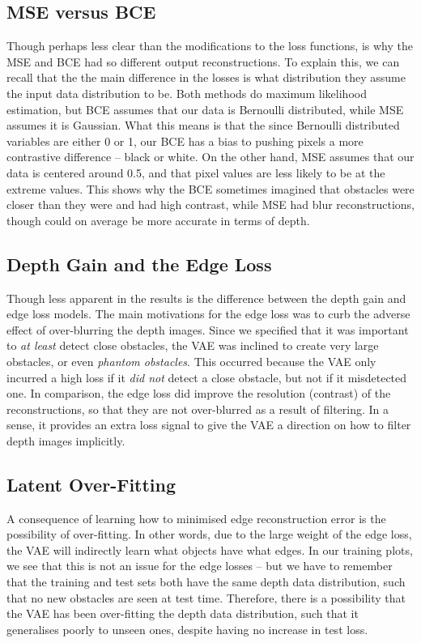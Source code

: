 \subsection{MSE versus BCE}
Though perhaps less clear than the modifications to the loss functions, is why the MSE and BCE had so different output reconstructions. To explain this, we can recall that the the main difference in the losses is what distribution they assume the input data distribution to be. Both methods do maximum likelihood estimation, but BCE assumes that our data is Bernoulli distributed, while MSE assumes it is Gaussian. What this means is that the since Bernoulli distributed variables are either 0 or 1, our BCE has a bias to pushing pixels a more contrastive difference -- black or white. On the other hand, MSE assumes that our data is centered around 0.5, and that pixel values are less likely to be at the extreme values. This shows why the BCE sometimes imagined that obstacles were closer than they were and had high contrast, while MSE had blur reconstructions, though could on average be more accurate in terms of depth.

\subsection{Depth Gain and the Edge Loss}
Though less apparent in the results is the difference between the depth gain and edge loss models. The main motivations for the edge loss was to curb the adverse effect of over-blurring the depth images. 
Since we specified that it was important to \textit{at least} detect close obstacles, the VAE was inclined to create very large obstacles, or even \textit{phantom obstacles}. This occurred because the VAE only incurred a high loss if it \textit{did not} detect a close obstacle, but not if it misdetected one. 
In comparison, the edge loss did improve the resolution (contrast) of the reconstructions, so that they are not over-blurred as a result of filtering. In a sense, it provides an extra loss signal to give the VAE a direction on how to filter depth images implicitly.

\subsection{Latent Over-Fitting}
A consequence of learning how to minimised edge reconstruction error is the possibility of over-fitting. In other words, due to the large weight of the edge loss, the VAE will indirectly learn what objects have what edges. In our training plots, we see that this is not an issue for the edge losses -- but we have to remember that the training and test sets both have the same depth data distribution, such that no new obstacles are seen at test time. Therefore, there is a possibility that the VAE has been over-fitting the depth data distribution, such that it generalises poorly to unseen ones, despite having no increase in test loss. 

